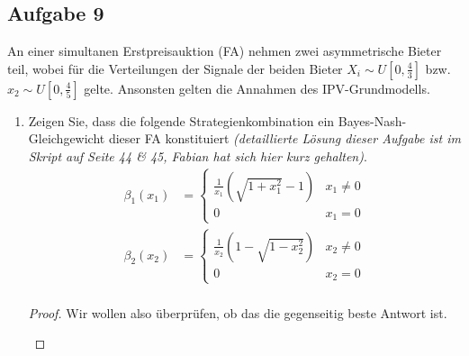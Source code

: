 \documentclass[12pt]{extreport} %
\theoremstyle{named}
\theoremstyle{itshape}
\theoremstyle{normal}
\begin{document}
\subsection*{Aufgabe 9}

An einer simultanen Erstpreisauktion (FA) nehmen zwei asymmetrische Bieter teil, wobei für die Verteilungen der Signale der beiden Bieter $X_{i} \sim U[0, \frac{4}{3}]$ bzw. $x_{2} \sim U[0, \frac{4}{5}]$ gelte. Ansonsten gelten die Annahmen des IPV-Grundmodells.

\begin{enumerate}
	\item Zeigen Sie, dass die folgende Strategienkombination ein Bayes-Nash-Gleichgewicht dieser FA konstituiert \textit{(detaillierte Lösung dieser Aufgabe ist im Skript auf Seite 44 \& 45, Fabian hat sich hier kurz gehalten)}.
		\begin{align*}
			\beta_{1}(x_{1}) & = \begin{cases} \frac{1}{x_{1}} \left( \sqrt{1+x_{1}^{2}} - 1 \right) & x_{1} \neq 0 \\ 0 & x_{1} = 0 \end{cases} \\
			\beta_{2}(x_{2}) & = \begin{cases} \frac{1}{x_{2}} \left( 1 - \sqrt{1-x_{2}^{2}}  \right) & x_{2} \neq 0 \\ 0 & x_{2} = 0 \end{cases} \\
		\end{align*}
		\begin{proof}
			Wir wollen also überprüfen, ob das die gegenseitig beste Antwort ist.
				\begin{figure*}[h] \centering
\end{figure*}
\end{proof}
\end{enumerate}
\end{document}
